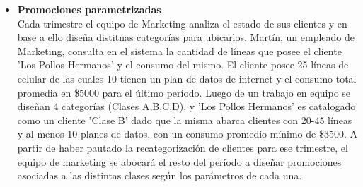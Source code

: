 \begin{itemize}
  \item \textbf{Promociones parametrizadas} \\
    Cada trimestre el equipo de Marketing analiza el estado de sus clientes y en base a ello diseña distitnas categorías para ubicarlos. Martín, un empleado de Marketing, consulta en el sistema la cantidad de líneas que posee el cliente 'Los Pollos Hermanos' y el consumo del mismo. El cliente posee 25 líneas de celular de las cuales 10 tienen un plan de datos de internet y el consumo total promedia en \$5000 para el último período. Luego de un trabajo en equipo se diseñan 4 categorías (Clases A,B,C,D), y 'Los Pollos Hermanos' es catalogado como un cliente 'Clase B' dado que la misma abarca clientes con 20-45 líneas y al menos 10 planes de datos, con un consumo promedio mínimo de \$3500. A partir de haber pautado la recategorización de clientes para ese trimestre, el equipo de marketing se abocará el resto del período a diseñar promociones asociadas a las distintas clases según los parámetros de cada una.


\end{itemize}
